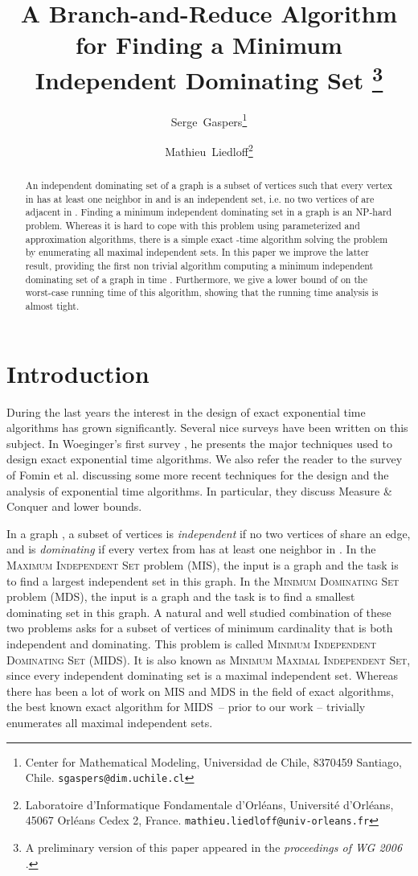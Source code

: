 \documentclass[a4paper,10pt]{article}
\title{A Branch-and-Reduce Algorithm for Finding a Minimum Independent
Dominating Set
\footnote{A preliminary version of this paper appeared in the
\textit{proceedings of WG 2006} \cite{WG2006}.}
}
\author{Serge~Gaspers\thanks{Center for Mathematical Modeling,
Universidad de Chile, 8370459 Santiago, Chile.
\texttt{sgaspers@dim.uchile.cl}}
\and Mathieu~Liedloff\thanks{Laboratoire d'Informatique Fondamentale d'Orl\'eans,
Universit{\'e} d'Orl{\'e}ans, 45067 Orl{\'e}ans Cedex 2, France.
\texttt{mathieu.liedloff@univ-orleans.fr}}
}
\date{}
\theoremstyle{plain}
\theoremstyle{definition}
\theoremstyle{remark}
\newcommand{\ids}{independent dominating set\xspace}
\newcommand{\MIDSpb}{\textsc{MIDS}\xspace}
\newcommand{\MISpb}{\textsc{MIS}\xspace}
\newcommand{\MDSpb}{\textsc{MDS}\xspace}
\begin{document}
\SetAlgoSkip{}

\maketitle



\begin{abstract}
An \ids  of a graph  is a subset of vertices such that
every vertex in  has at least one neighbor in  and
 is an independent set, i.e. no two vertices of 
are adjacent in . Finding a minimum \ids in a graph is an NP-hard problem.
Whereas it is hard to cope with this problem using parameterized
and approximation algorithms, there is a simple exact -time algorithm
solving the problem by enumerating all maximal independent sets.
In this paper we improve the latter result, providing the first non trivial algorithm computing a minimum \ids of a
graph in time .
Furthermore, we give a lower bound of  on the worst-case running time of this algorithm,
showing that the running time analysis is almost tight.
\end{abstract} 


\section{Introduction}


During the last years the interest in the design of
exact exponential time algorithms has grown significantly.
Several nice surveys have been written on this subject.
In Woeginger's first survey \cite{Woeginger}, he presents the
major techniques used to design exact exponential time algorithms.
We also refer the reader to the survey of Fomin et al. \cite{SurveyFGK}
discussing some more recent techniques for the design and the analysis of exponential time algorithms. 
In particular, they discuss Measure \& Conquer and lower bounds.

In a graph , a subset of vertices  is \emph{independent} if no two vertices
of  share an edge, and  is \emph{dominating} if every vertex from  has at least one neighbor
in .
In the \textsc{Maximum Independent Set} problem (\MISpb), the input is a graph and the task is to find a largest
independent set in this graph. In the \textsc{Minimum Dominating Set} problem (\MDSpb), the input is
a graph and the task is to find a smallest dominating set in this graph.
A natural and well studied combination of these two problems asks for a subset of vertices
of minimum cardinality that is both independent and dominating. This problem is called
\textsc{Minimum Independent Dominating Set} (\MIDSpb).
It is also known as
\textsc{Minimum Maximal Independent Set}, since every \ids is a maximal independent set.
Whereas there has been a lot of work on \MISpb and \MDSpb
in the field of exact algorithms, the best known exact algorithm for
\MIDSpb\ -- prior to our work -- trivially enumerates all maximal independent sets.
\end{document}
